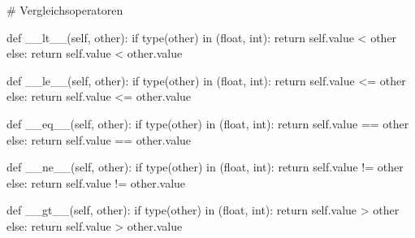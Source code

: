 \documentclass[
  letterpaper,
  DIV=11,
  oneside]{scrreprt}
\newenvironment{Shaded}{\begin{snugshade}}{\end{snugshade}}
\newcommand{\BuiltInTok}[1]{\textcolor[rgb]{0.00,0.23,0.31}{#1}}
\newcommand{\CommentTok}[1]{\textcolor[rgb]{0.37,0.37,0.37}{#1}}
\newcommand{\ControlFlowTok}[1]{\textcolor[rgb]{0.00,0.23,0.31}{#1}}
\newcommand{\FunctionTok}[1]{\textcolor[rgb]{0.28,0.35,0.67}{#1}}
\newcommand{\KeywordTok}[1]{\textcolor[rgb]{0.00,0.23,0.31}{#1}}
\newcommand{\NormalTok}[1]{\textcolor[rgb]{0.00,0.23,0.31}{#1}}
\newcommand{\OperatorTok}[1]{\textcolor[rgb]{0.37,0.37,0.37}{#1}}
\newcommand{\VariableTok}[1]{\textcolor[rgb]{0.07,0.07,0.07}{#1}}
\theoremstyle{definition}
\theoremstyle{definition}
\theoremstyle{remark}
\begin{document}
\begin{Shaded}
\begin{Highlighting}[]
\CommentTok{\# Vergleichsoperatoren }

\KeywordTok{def} \FunctionTok{\_\_lt\_\_}\NormalTok{(}\VariableTok{self}\NormalTok{, other):}
    \ControlFlowTok{if} \BuiltInTok{type}\NormalTok{(other) }\KeywordTok{in}\NormalTok{ (}\BuiltInTok{float}\NormalTok{, }\BuiltInTok{int}\NormalTok{):}
        \ControlFlowTok{return} \VariableTok{self}\NormalTok{.value }\OperatorTok{\textless{}}\NormalTok{ other}
    \ControlFlowTok{else}\NormalTok{:}
        \ControlFlowTok{return} \VariableTok{self}\NormalTok{.value }\OperatorTok{\textless{}}\NormalTok{ other.value}

\KeywordTok{def} \FunctionTok{\_\_le\_\_}\NormalTok{(}\VariableTok{self}\NormalTok{, other):}
    \ControlFlowTok{if} \BuiltInTok{type}\NormalTok{(other) }\KeywordTok{in}\NormalTok{ (}\BuiltInTok{float}\NormalTok{, }\BuiltInTok{int}\NormalTok{):}
        \ControlFlowTok{return} \VariableTok{self}\NormalTok{.value }\OperatorTok{\textless{}=}\NormalTok{ other}
    \ControlFlowTok{else}\NormalTok{:}
        \ControlFlowTok{return} \VariableTok{self}\NormalTok{.value }\OperatorTok{\textless{}=}\NormalTok{ other.value}

\KeywordTok{def} \FunctionTok{\_\_eq\_\_}\NormalTok{(}\VariableTok{self}\NormalTok{, other):}
    \ControlFlowTok{if} \BuiltInTok{type}\NormalTok{(other) }\KeywordTok{in}\NormalTok{ (}\BuiltInTok{float}\NormalTok{, }\BuiltInTok{int}\NormalTok{):}
        \ControlFlowTok{return} \VariableTok{self}\NormalTok{.value }\OperatorTok{==}\NormalTok{ other}
    \ControlFlowTok{else}\NormalTok{:}
        \ControlFlowTok{return} \VariableTok{self}\NormalTok{.value }\OperatorTok{==}\NormalTok{ other.value}

\KeywordTok{def} \FunctionTok{\_\_ne\_\_}\NormalTok{(}\VariableTok{self}\NormalTok{, other):}
    \ControlFlowTok{if} \BuiltInTok{type}\NormalTok{(other) }\KeywordTok{in}\NormalTok{ (}\BuiltInTok{float}\NormalTok{, }\BuiltInTok{int}\NormalTok{):}
        \ControlFlowTok{return} \VariableTok{self}\NormalTok{.value }\OperatorTok{!=}\NormalTok{ other}
    \ControlFlowTok{else}\NormalTok{:}
        \ControlFlowTok{return} \VariableTok{self}\NormalTok{.value }\OperatorTok{!=}\NormalTok{ other.value}

\KeywordTok{def} \FunctionTok{\_\_gt\_\_}\NormalTok{(}\VariableTok{self}\NormalTok{, other):}
    \ControlFlowTok{if} \BuiltInTok{type}\NormalTok{(other) }\KeywordTok{in}\NormalTok{ (}\BuiltInTok{float}\NormalTok{, }\BuiltInTok{int}\NormalTok{):}
        \ControlFlowTok{return} \VariableTok{self}\NormalTok{.value }\OperatorTok{\textgreater{}}\NormalTok{ other}
    \ControlFlowTok{else}\NormalTok{:}
        \ControlFlowTok{return} \VariableTok{self}\NormalTok{.value }\OperatorTok{\textgreater{}}\NormalTok{ other.value}


\end{Highlighting}
\end{Shaded}
\end{document}

